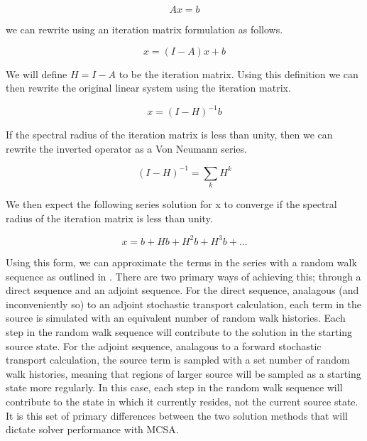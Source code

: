 \documentclass[note]{TechNote}
\begin{document}
\begin{equation}
  A x = b
  \label{eq:linear_system}
\end{equation}

we can rewrite using an iteration matrix formulation as follows.

\begin{equation}
  x = (I-A) x + b
  \label{eq:iteration_form}
\end{equation}

We will define $H=I-A$ to be the iteration matrix. Using this
definition we can then rewrite the original linear system using the
iteration matrix.

\begin{equation}
  x = (I-H)^{-1} b
  \label{eq:iteration_form2}
\end{equation}

If the spectral radius of the iteration matrix is less than unity,
then we can rewrite the inverted operator as a Von Neumann series.

\begin{equation}
  (I-H)^{-1} = \sum_k H^k
  \label{eq:von_neumann_series}
\end{equation}

We then expect the following series solution for x to converge if the
spectral radius of the iteration matrix is less than unity.

\begin{equation}
  x = b + H b + H^2 b + H^3 b + ...
  \label{eq:series_solution}
\end{equation}

Using this form, we can approximate the terms in the series with a
random walk sequence as outlined in \cite{hammersley_1964}. There are
two primary ways of achieving this; through a direct sequence and an
adjoint sequence. For the direct sequence, analagous (and
inconveniently so) to an adjoint stochastic transport calculation,
each term in the source is simulated with an equivalent number of
random walk histories. Each step in the random walk sequence will
contribute to the solution in the starting source state. For the
adjoint sequence, analagous to a forward stochastic transport
calculation, the source term is sampled with a set number of random
walk histories, meaning that regions of larger source will be sampled
as a starting state more regularly. In this case, each step in the
random walk sequence will contribute to the state in which it
currently resides, not the current source state. It is this set of
primary differences between the two solution methods that will dictate
solver performance with MCSA.
\end{document}
